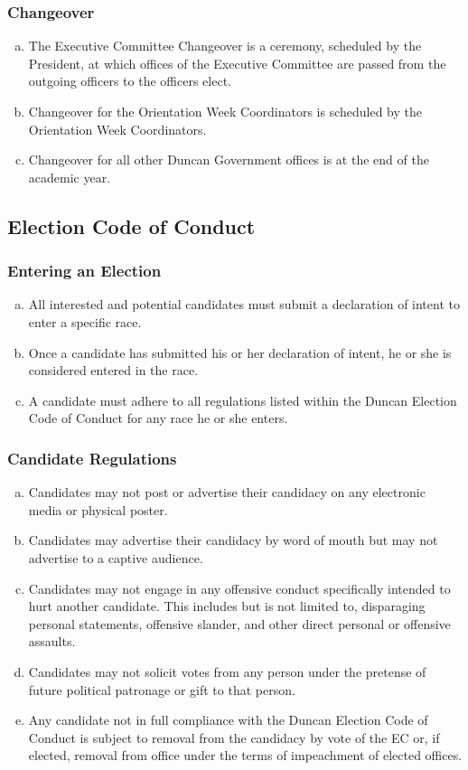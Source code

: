 \documentclass[USletter,12pt]{article}
\begin{document}
\subsubsection{Changeover}
\begin{enumerate}[(a)]
\item The Executive Committee Changeover is a ceremony, scheduled by the President, at which offices of the Executive Committee are passed from the outgoing officers to the officers elect.
\item Changeover for the Orientation Week Coordinators is scheduled by the Orientation Week Coordinators.
\item Changeover for all other Duncan Government offices is at the end of the academic year.
\end{enumerate}


\subsection{Election Code of Conduct}


\subsubsection{Entering an Election}
\begin{enumerate}[(a)]
\item All interested and potential candidates must submit a declaration of intent to enter a specific race.
\item Once a candidate has submitted his or her declaration of intent, he or she is considered entered in the race.
\item A candidate must adhere to all regulations listed within the Duncan Election Code of Conduct for any race he or she enters.
\end{enumerate}

\subsubsection{Candidate Regulations}
\begin{enumerate}[(a)]
\item Candidates may not post or advertise their candidacy on any electronic media or physical poster.
\item Candidates may advertise their candidacy by word of mouth but may not advertise to a captive audience.
\item Candidates may not engage in any offensive conduct specifically intended to hurt another candidate.  This includes but is not limited to, disparaging personal statements, offensive slander, and other direct personal or offensive assaults.
\item Candidates may not solicit votes from any person under the pretense of future political patronage or gift to that person.
\item Any candidate not in full compliance with the Duncan Election Code of Conduct is subject to removal from the candidacy by vote of the EC or, if elected, removal from office under the terms of impeachment of elected offices.
\end{enumerate}
\end{document}
